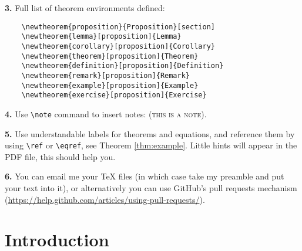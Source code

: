 \documentclass[letterpaper,11pt,oneside,reqno]{amsart}
\numberwithin{equation}{section}
\newcommand{\note}[1]{\textsc{\color{blue}(#1)}}
\theoremstyle{definition}
\begin{document}
\textbf{3.} Full list of theorem environments defined:
\begin{lstlisting}
	\newtheorem{proposition}{Proposition}[section]
	\newtheorem{lemma}[proposition]{Lemma}
	\newtheorem{corollary}[proposition]{Corollary}
	\newtheorem{theorem}[proposition]{Theorem}
	\newtheorem{definition}[proposition]{Definition}
	\newtheorem{remark}[proposition]{Remark}
	\newtheorem{example}[proposition]{Example}
	\newtheorem{exercise}[proposition]{Exercise}	
\end{lstlisting}

\textbf{4.} Use \lstinline{\note} command to insert notes: \note{this is a note}.

\textbf{5.} Use understandable labels for theorems and equations, and reference them by using \lstinline{\ref}
or \lstinline{\eqref}, see Theorem \ref{thm:example}. Little hints will appear in the PDF file, 
this should help you.

\textbf{6.} You can email me your \TeX{} files (in which case take
my preamble and put your text into it), or alternatively you can use GitHub's pull requests mechanism
(\url{https://help.github.com/articles/using-pull-requests/}).


\section{Introduction} %
\label{sec:introduction}










\end{document}
